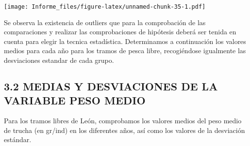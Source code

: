 \documentclass[
]{article}
\begin{document}
\texttt{[image: Informe\_files/figure-latex/unnamed-chunk-35-1.pdf]}

Se observa la existencia de outliers que para la comprobación de las
comparaciones y realizar las comprobaciones de hipótesis deberá ser
tenida en cuenta para elegir la tecnica estadística. Determinamos a
continuación los valores medios para cada año para los tramos de pesca
libre, recogiéndose igualmente las desviaciones estandar de cada grupo.

\hypertarget{medias-y-desviaciones-de-la-variable-peso-medio}{%
\subsection{3.2 MEDIAS Y DESVIACIONES DE LA VARIABLE PESO
MEDIO}\label{medias-y-desviaciones-de-la-variable-peso-medio}}

Para los tramos libres de León, comprobamos los valores medios del peso
medio de trucha (en gr/ind) en los diferentes años, así como los valores
de la desviación estándar.
\end{document}
